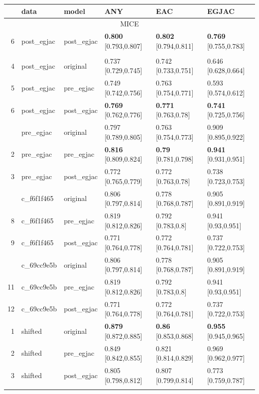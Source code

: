 \documentclass[12pt]{article}
\begin{document}
\begin{table}[ht]
\centering
\begin{tabular}{rlllll}
\toprule
& data & model & ANY & EAC & EGJAC \\
\midrule

\multicolumn{6}{c}{MICE} \\
  6 & post\_egjac & post\_egjac & \textbf{0.800} [0.793,0.807] & \textbf{0.802} [0.794,0.811] & \textbf{0.769} [0.755,0.783] \\ \addlinespace

\multicolumn{6}{c}{SRS} \\
  4 & post\_egjac & original & 0.737 [0.729,0.745] & 0.742 [0.733,0.751] & 0.646 [0.628,0.664] \\ 
  5 & post\_egjac & pre\_egjac & 0.749 [0.742,0.756] & 0.763 [0.754,0.771] & 0.593 [0.574,0.612] \\ 
  6 & post\_egjac & post\_egjac & \textbf{0.769} [0.762,0.776] & \textbf{0.771} [0.763,0.78] & \textbf{0.741} [0.725,0.756] \\ \addlinespace
1 & pre\_egjac & original & 0.797 [0.789,0.805] & 0.763 [0.754,0.773] & 0.909 [0.895,0.922] \\ 
  2 & pre\_egjac & pre\_egjac & \textbf{0.816} [0.809,0.824] & \textbf{0.79} [0.781,0.798] & \textbf{0.941} [0.931,0.951] \\ 
  3 & pre\_egjac & post\_egjac & 0.772 [0.765,0.779] & 0.772 [0.763,0.78] & 0.738 [0.723,0.753] \\ \addlinespace
  7 & c\_f6f1f465 & original & 0.806 [0.797,0.814] & 0.778 [0.768,0.787] & 0.905 [0.891,0.919] \\ 
  8 & c\_f6f1f465 & pre\_egjac & 0.819 [0.812,0.826] & 0.792 [0.783,0.8] & 0.941 [0.93,0.951] \\ 
  9 & c\_f6f1f465 & post\_egjac & 0.771 [0.764,0.778] & 0.772 [0.764,0.781] & 0.737 [0.722,0.753] \\ \addlinespace
  10 & c\_69cc9e5b & original & 0.806 [0.797,0.814] & 0.778 [0.768,0.787] & 0.905 [0.891,0.919] \\ 
  11 & c\_69cc9e5b & pre\_egjac & 0.819 [0.812,0.826] & 0.792 [0.783,0.8] & 0.941 [0.93,0.951] \\ 
  12 & c\_69cc9e5b & post\_egjac & 0.771 [0.764,0.778] & 0.772 [0.764,0.781] & 0.737 [0.722,0.753] \\ \addlinespace

1 & shifted & original & \textbf{0.879} [0.872,0.885] & \textbf{0.86} [0.853,0.868] & \textbf{0.955} [0.945,0.965] \\ 
  2 & shifted & pre\_egjac & 0.849 [0.842,0.855] & 0.821 [0.814,0.829] & 0.969 [0.962,0.977] \\ 
  3 & shifted & post\_egjac & 0.805 [0.798,0.812] & 0.807 [0.799,0.814] & 0.773 [0.759,0.787] \\ \addlinespace


\end{tabular}
\end{table}
\end{document}
